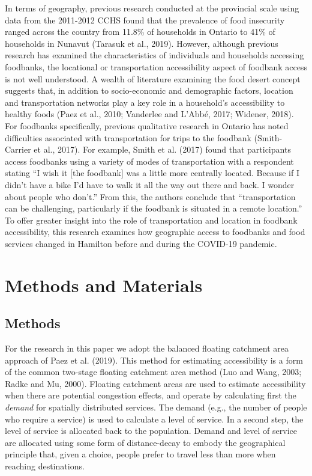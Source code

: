 \documentclass[]{elsarticle} %
\begin{document}
In terms of geography, previous research conducted at the provincial
scale using data from the 2011-2012 CCHS found that the prevalence of
food insecurity ranged across the country from 11.8\% of households in
Ontario to 41\% of households in Nunavut (Tarasuk et al., 2019).
However, although previous research has examined the characteristics of
individuals and households accessing foodbanks, the locational or
transportation accessibility aspect of foodbank access is not well
understood. A wealth of literature examining the food desert concept
suggests that, in addition to socio-economic and demographic factors,
location and transportation networks play a key role in a household's
accessibility to healthy foods (Paez et al., 2010; Vanderlee and L'Abbé,
2017; Widener, 2018). For foodbanks specifically, previous qualitative
research in Ontario has noted difficulties associated with
transportation for trips to the foodbank (Smith-Carrier et al., 2017).
For example, Smith et al. (2017) found that participants access
foodbanks using a variety of modes of transportation with a respondent
stating ``I wish it {[}the foodbank{]} was a little more centrally
located. Because if I didn't have a bike I'd have to walk it all the way
out there and back. I wonder about people who don't.'' From this, the
authors conclude that ``transportation can be challenging, particularly
if the foodbank is situated in a remote location.'' To offer greater
insight into the role of transportation and location in foodbank
accessibility, this research examines how geographic access to foodbanks
and food services changed in Hamilton before and during the COVID-19
pandemic.

\hypertarget{methods-and-materials}{%
\section{Methods and Materials}\label{methods-and-materials}}

\hypertarget{methods}{%
\subsection{Methods}\label{methods}}

For the research in this paper we adopt the balanced floating catchment
area approach of Paez et al. (2019). This method for estimating
accessibility is a form of the common two-stage floating catchment area
method (Luo and Wang, 2003; Radke and Mu, 2000). Floating catchment
areas are used to estimate accessibility when there are potential
congestion effects, and operate by calculating first the \emph{demand}
for spatially distributed services. The demand (e.g., the number of
people who require a service) is used to calculate a level of service.
In a second step, the level of service is allocated back to the
population. Demand and level of service are allocated using some form of
distance-decay to embody the geographical principle that, given a
choice, people prefer to travel less than more when reaching
destinations.
\end{document}
